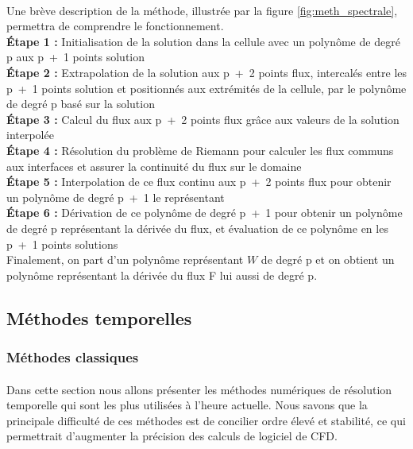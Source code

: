         \paragraph{}
        Une brève description de la méthode, illustrée par la figure \ref{fig:meth_spectrale}, permettra de comprendre le fonctionnement.\\
        \textbf{Étape 1 :} Initialisation de la solution dans la cellule avec un polynôme de degré p aux p~+~1 points solution\\
        \textbf{Étape 2 :} Extrapolation de la solution aux p~+~2 points flux, intercalés entre les p~+~1 points solution et positionnés aux extrémités de la cellule, par le polynôme de degré p basé sur la solution\\
        \textbf{Étape 3 :} Calcul du flux aux p~+~2 points flux grâce aux valeurs de la solution interpolée\\
        \textbf{Étape 4 :} Résolution du problème de Riemann pour calculer les flux communs aux interfaces et assurer la continuité du flux sur le domaine\\
        \textbf{Étape 5 :} Interpolation de ce flux continu aux p~+~2 points flux pour obtenir un polynôme de degré p~+~1 le représentant\\
        \textbf{Étape 6 :} Dérivation de ce polynôme de degré p~+~1 pour obtenir un polynôme de degré p représentant la dérivée du flux, et évaluation de ce polynôme en les p~+~1 points solutions\\
        Finalement, on part d'un polynôme représentant $W$ de degré p et on obtient un polynôme représentant la dérivée du flux F lui aussi de degré p.


\subsection{Méthodes temporelles}

    \subsubsection{Méthodes classiques}
        \paragraph{}
        Dans cette section nous allons présenter les méthodes numériques de résolution temporelle qui sont les plus utilisées à l'heure actuelle. Nous savons que la principale difficulté de ces méthodes est de concilier ordre élevé et stabilité, ce qui permettrait d'augmenter la précision des calculs de logiciel de CFD.

